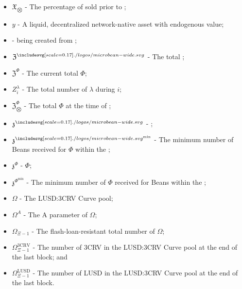 \documentclass[class=article, crop=false]{standalone}
\begin{document}
\begin{itemize}[topsep=0pt, itemsep=3pt,leftmargin=16pt]
    \item[] $\mathfrak{X}_{\bigotimes}$ - \hypertarget{ht226}{The percentage of  sold prior to };
    \item[] $y$ - \hypertarget{ht227}{A liquid, decentralized network-native asset with endogenous value};
    \item[]  - \hypertarget{ht228}{ being created from  \Bean};
    \item[] $\mathfrak{Z}^{\bean}$ - \hypertarget{ht229}{The total  \Bean};
    \item[] $\mathfrak{Z}^{\Phi}$ - \hypertarget{ht230}{The current total  $\Phi$};
    \item[] $Z_i^{\lambda}$ - \hypertarget{ht231}{The total number of $\lambda$  during  $i$};
    \item[] $\mathfrak{Z}_{\bigotimes}^{\Phi}$ - \hypertarget{ht232}{The total  $\Phi$ at the time of };
    \item[] $\mathfrak{z}^{\bean}$ - \hypertarget{ht233}{ \Bean};
    \item[] $\mathfrak{z}^{\bean^{\text{min}}}$ - \hypertarget{ht234}{The minimum number of  Beans received for    $\Phi$ within the };
    \item[] $\mathfrak{z}^{\Phi}$ - \hypertarget{ht235}{ $\Phi$};
    \item[] $\mathfrak{z}^{\Phi^{\text{min}}}$ - \hypertarget{ht236}{The minimum number of  $\Phi$ received for    Beans within the };
    \item[] $\Omega$ - \hypertarget{ht237}{The LUSD:3CRV Curve pool};
    \item[] $\Omega^{A}$ - \hypertarget{ht238}{The A parameter of $\Omega$};
    \item[] $\Omega_{\Xi-1}$ - \hypertarget{ht239}{The flash-loan-resistant total number of $\Omega$};
    \item[] $\Omega_{\Xi-1}^{\text{3CRV}}$ - \hypertarget{ht240}{The number of 3CRV in the LUSD:3CRV Curve pool at the end of the last block}; and
    \item[] $\Omega_{\Xi-1}^{\text{LUSD}}$ - \hypertarget{ht241}{The number of LUSD in the LUSD:3CRV Curve pool at the end of the last block}.
\end{itemize}
\end{document}
